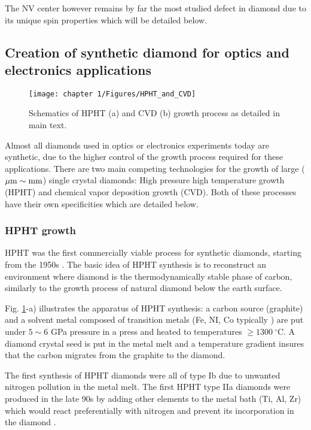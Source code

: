 \documentclass[a4paper, 11pt]{report}
\begin{document}
The NV center however remains by far the most studied defect in diamond due to its unique spin properties which will be detailed below.

\subsection{Creation of synthetic diamond for optics and electronics applications}
\begin{figure}[h!]
\centering
\texttt{[image: chapter 1/Figures/HPHT\_and\_CVD]}
\caption{Schematics of HPHT (a) and CVD (b) growth process as detailed in main text.}
\label{HPHT and CVD}
\end{figure}

Almost all diamonds used in optics or electronics experiments today are synthetic, due to the higher control of the growth process required for these applications. There are two main competing technologies for the growth of large ($\mu \rm{m} \sim \rm{mm}$) single crystal diamonds: High pressure high temperature growth (HPHT) and chemical vapor deposition growth (CVD). Both of these processes have their own specificities which are detailed below.

\subsubsection{HPHT growth}

HPHT was the first commercially viable process for synthetic diamonds, starting from the 1950s \citep{barnard2000diamond, bundy1955man}. The basic idea of HPHT synthesis is to reconstruct an environment where diamond is the thermodynamically stable phase of carbon, similarly to the growth process of natural diamond below the earth surface. 

Fig. \ref{HPHT and CVD}-a) illustrates the apparatus of HPHT synthesis: a carbon source (graphite) and a solvent metal composed of transition metals (Fe, NI, Co typically \citep{bundy1963direct}) are put under $5 \sim 6$ GPa pressure in a press and heated to temperatures $\geq 1300\ ^\circ$C. A diamond crystal seed is put in the metal melt and a temperature gradient insures that the carbon migrates from the graphite to the diamond.

The first synthesis of HPHT diamonds were all of type Ib due to unwanted nitrogen pollution in the metal melt. The first HPHT type IIa diamonds were produced in the late 90s by adding other elements to the metal bath (Ti, Al, Zr) which would react preferentially with nitrogen and prevent its incorporation in the diamond \citep{burns1999growth, sumiya2002growth}.
\end{document}
